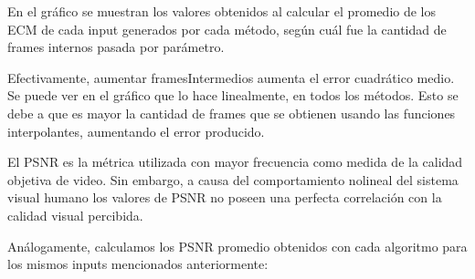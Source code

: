 \begin{figure}[ht]
	\begin{center}
	\end{center}
\end{figure}

\par En el gráfico se muestran los valores obtenidos al calcular el promedio de los ECM de cada input generados por cada método, según cuál fue la cantidad de frames internos pasada por parámetro.
\par Efectivamente, aumentar framesIntermedios aumenta el error cuadrático medio. Se puede ver en el gráfico que lo hace linealmente, en todos los métodos. Esto se debe a que es mayor la cantidad de frames que se obtienen usando las funciones interpolantes, aumentando el error producido.


\par El PSNR es la métrica utilizada con mayor frecuencia como medida de la calidad objetiva de video. Sin embargo, a causa del comportamiento nolineal del sistema visual humano los valores de PSNR no poseen una perfecta correlación con la calidad visual percibida. 
\par Análogamente, calculamos los PSNR promedio obtenidos con cada algoritmo para los mismos inputs mencionados anteriormente:

\begin{figure}[ht]
	\begin{center}
	\end{center}
\end{figure}

